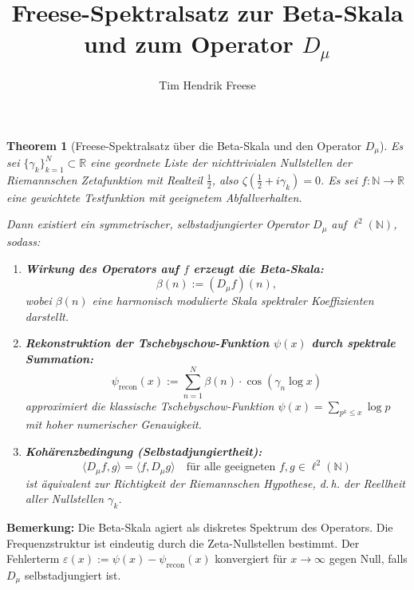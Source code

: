 \documentclass[12pt]{article}
\title{Freese-Spektralsatz zur Beta-Skala und zum Operator \texorpdfstring{$D_\mu$}{Dmu}}
\author{Tim Hendrik Freese}
\date{}
\newtheorem{theorem}{Theorem}
\begin{document}
\maketitle

\begin{theorem}[Freese-Spektralsatz über die Beta-Skala und den Operator $D_\mu$]
Es sei $\{\gamma_k\}_{k=1}^N \subset \mathbb{R}$ eine geordnete Liste der nichttrivialen Nullstellen der Riemannschen Zetafunktion mit Realteil $\tfrac{1}{2}$, also $\zeta\left(\tfrac{1}{2} + i\gamma_k\right) = 0$. Es sei $f: \mathbb{N} \to \mathbb{R}$ eine gewichtete Testfunktion mit geeignetem Abfallverhalten.

Dann existiert ein symmetrischer, selbstadjungierter Operator $D_\mu$ auf $\ell^2(\mathbb{N})$, sodass:

\begin{enumerate}
  \item \textbf{Wirkung des Operators auf $f$ erzeugt die Beta-Skala:}
  \[
    \beta(n) := (D_\mu f)(n),
  \]
  wobei $\beta(n)$ eine harmonisch modulierte Skala spektraler Koeffizienten darstellt.

  \item \textbf{Rekonstruktion der Tschebyschow-Funktion $\psi(x)$ durch spektrale Summation:}
  \[
    \psi_{\mathrm{recon}}(x) := \sum_{n=1}^N \beta(n) \cdot \cos(\gamma_n \log x)
  \]
  approximiert die klassische Tschebyschow-Funktion $\psi(x) = \sum_{p^k \leq x} \log p$ mit hoher numerischer Genauigkeit.

  \item \textbf{Kohärenzbedingung (Selbstadjungiertheit):}
  \[
    \langle D_\mu f, g \rangle = \langle f, D_\mu g \rangle \quad \text{für alle geeigneten } f, g \in \ell^2(\mathbb{N})
  \]
  ist äquivalent zur Richtigkeit der Riemannschen Hypothese, d.\,h. der Reellheit aller Nullstellen $\gamma_k$.
  \end{enumerate}
\end{theorem}

\begin{flushleft}
\textbf{Bemerkung:} Die Beta-Skala agiert als diskretes Spektrum des Operators. Die Frequenzstruktur ist eindeutig durch die Zeta-Nullstellen bestimmt. Der Fehlerterm $\varepsilon(x) := \psi(x) - \psi_{\mathrm{recon}}(x)$ konvergiert für $x \to \infty$ gegen Null, falls $D_\mu$ selbstadjungiert ist.
\end{flushleft}
\end{document}

